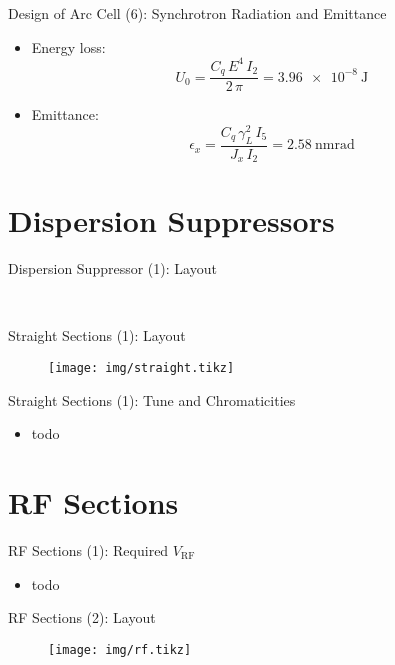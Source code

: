\documentclass{beamer}
\begin{document}
\begin{frame}[t]{Design of Arc Cell (6): Synchrotron Radiation and Emittance}
\begin{itemize}
\item Energy loss:
\begin{equation}
U_0 = \frac{C_q\,E^4\,I_2}{2\,\pi}=\SI{3.96e-8}{\joule}
\end{equation}
\item Emittance:
\begin{equation}
\epsilon_x = \frac{C_q\,\gamma_L^2\,I_5}{J_x\,I_2}=\SI{2.58}{\nano\meter\radian}
\end{equation}
\end{itemize}
\end{frame}





\section{Dispersion Suppressors}
\begin{frame}[t]{Dispersion Suppressor (1): Layout}
\begin{figure}
  \centering
  \\
\end{figure}
\end{frame}

\begin{frame}[t]{Straight Sections (1): Layout}
\begin{figure}
\centering
\texttt{[image: img/straight.tikz]}
\end{figure}
\end{frame}

\begin{frame}[t]{Straight Sections (1): Tune and Chromaticities}
\begin{itemize}
\item todo
\end{itemize}
\end{frame}

\section{RF Sections}
\begin{frame}[t]{RF Sections (1): Required $V_\text{RF}$}
\begin{itemize}
\item todo
\end{itemize}
\end{frame}

\begin{frame}[t]{RF Sections (2): Layout}
\begin{figure}
\centering
\texttt{[image: img/rf.tikz]}
\end{figure}
\end{frame}
\end{document}
